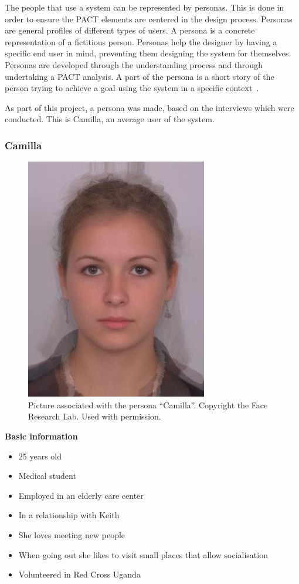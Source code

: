 The people that use a system can be represented by personas. This is done in order to ensure the PACT elements are centered in the design process. Personas are general profiles of different types of users. A persona is a concrete representation of a fictitious person. Personas help the designer by having a specific end user in mind, preventing them designing the system for themselves. Personas are developed through the understanding process and through undertaking a PACT analysis. A part of the persona is a short story of the person trying to achieve a goal using the system in a specific context~\cite{benyon2013designing}.

As part of this project, a persona was made, based on the interviews which were conducted.%
This is Camilla, an average user of the system.

\subsubsection{Camilla}
\begin{figure} [h]
  \centering
  \includegraphics[]{Images/average.jpg}
  \caption{Picture associated with the persona \enquote{Camilla}. Copyright the Face Research Lab. Used with permission.}
  \label{fig:camilla}
\end{figure}
\noindent\textbf{Basic information}
\begin{itemize}
\item 25 years old
\item Medical student
\item Employed in an elderly care center
\item In a relationship with Keith
\item She loves meeting new people
\item When going out she likes to visit small places that allow socialisation
\item Volunteered in Red Cross Uganda
\end{itemize}

